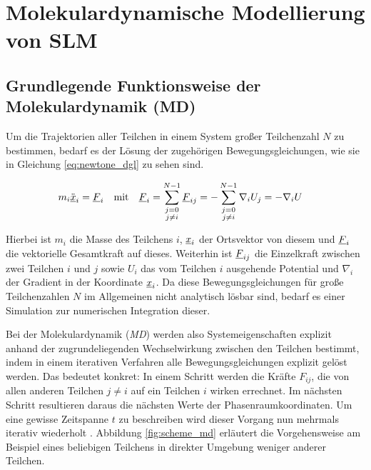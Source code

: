 \section{Molekulardynamische Modellierung von SLM}
	\subsection{Grundlegende Funktionsweise der Molekulardynamik (MD)}
		Um die Trajektorien aller Teilchen in einem System großer Teilchenzahl $N$ zu bestimmen,
		bedarf es der Lösung der zugehörigen Bewegungsgleichungen, wie sie in Gleichung
		\eqref{eq:newtone_dgl} zu sehen sind.

		\begin{align}
			m_i \ddot{\underline{x}}_i &= \underline{F}_i
			& \text{mit} &&
			\underline{F}_{i} &= \sum_{\substack{j=0\\j \neq i}}^{N-1} \underline{F}_{ij}
			= -\sum_{\substack{j=0\\j \neq i}}^{N-1} \nabla_i U_j = -\nabla_i U
			\label{eq:newtone_dgl}
		\end{align}

		Hierbei ist $m_i$ die Masse des Teilchens $i$, $\underline{x}_i$ der Ortsvektor von diesem und
		$\underline{F}_{i}$ die vektorielle Gesamtkraft auf dieses. Weiterhin ist $\underline{F}_{ij}$ die
		Einzelkraft zwischen zwei Teilchen $i$ und $j$ sowie $U_i$ das vom Teilchen $i$ ausgehende
		Potential und $\nabla_i$ der Gradient in der Koordinate $\underline{x}_i$. Da diese
		Bewegungsgleichungen für große Teilchenzahlen $N$ im Allgemeinen nicht analytisch lösbar
		sind,  bedarf es einer
		Simulation zur numerischen Integration dieser.

		Bei der Molekulardynamik (\emph{MD}) werden also Systemeigenschaften explizit anhand der
		zugrundeliegenden Wechselwirkung zwischen den Teilchen bestimmt, indem in einem
		iterativen Verfahren alle Bewegungsgleichungen explizit gelöst werden. Das bedeutet
		konkret: In einem Schritt werden die Kräfte $F_{ij}$, die von allen anderen Teilchen
		$j \neq i$ auf ein Teilchen $i$ wirken errechnet. Im nächsten Schritt resultieren daraus
		die nächsten Werte der Phasenraumkoordinaten. Um eine gewisse Zeitspanne $t$ zu
		beschreiben wird dieser Vorgang nun mehrmals iterativ wiederholt
		\cite{allen2004introduction}. Abbildung \ref{fig:scheme_md} erläutert die Vorgehensweise
		am Beispiel eines beliebigen Teilchens in direkter Umgebung weniger anderer Teilchen.


